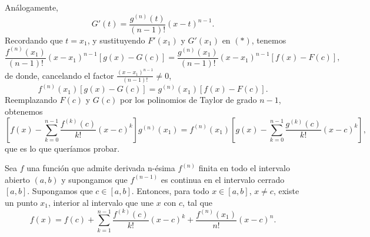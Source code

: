 \begin{prueba}
\[    \]
    Análogamente,
    \[
    G'(t)=\frac{g^{(n)}(t)}{(n-1)!}(x-t)^{n-1}.
    \]
    Recordando que $t=x_{1}$, y sustituyendo $F'(x_{1})$ y $G'(x_{1})$ en $(*)$, tenemos
    \[
    \frac{f^{(n)}(x_{1})}{(n-1)!}(x-x_{1})^{n-1}\left[ g(x)-G(c) \right]
    =
    \frac{g^{(n)}(x_{1})}{(n-1)!}(x-x_{1})^{n-1}\left[ f(x)-F(c) \right],
    \]
    de donde, cancelando el factor $\frac{(x-x_{1})^{n-1}}{(n-1)!}\neq 0$,
    \[
    f^{(n)}(x_{1})\left[ g(x)-G(c) \right]=g^{(n)}(x_{1})\left[ f(x)-F(c) \right].
    \]
    Reemplazando $F(c)$ y $G(c)$ por los polinomios de Taylor de grado $n-1$, obtenemos
    \[
    \left[ f(x)-\sum_{k=0}^{n-1}\frac{f^{(k)}(c)}{k!}(x-c)^{k} \right]g^{(n)}(x_{1})
    =
    f^{(n)}(x_{1})\left[ g(x)-\sum_{k=0}^{n-1}\frac{g^{(k)}(c)}{k!}(x-c)^{k} \right],
    \]
    que es lo que queríamos probar.
\end{prueba}

\begin{teorema}
     Sea $f$ una función que admite derivada n-ésima $f^{(n)}$ finita en todo el intervalo abierto $(a,b)$ y supongamos que $f^{(n-1)}$ es continua en el intervalo cerrado $[a,b]$. Supongamos que $c\in[a,b]$. Entonces, para todo $x\in[a,b]$, $x\neq c$, existe un punto $x_{1}$, interior al intervalo que une $x$ con $c$, tal que
     \[
     f(x)=f(c)+\sum_{k=1}^{n-1}\frac{f^{(k)}(c)}{k!}(x-c)^{k}+\frac{f^{(n)}(x_{1})}{n!}(x-c)^{n}.
     \]
\end{teorema}


